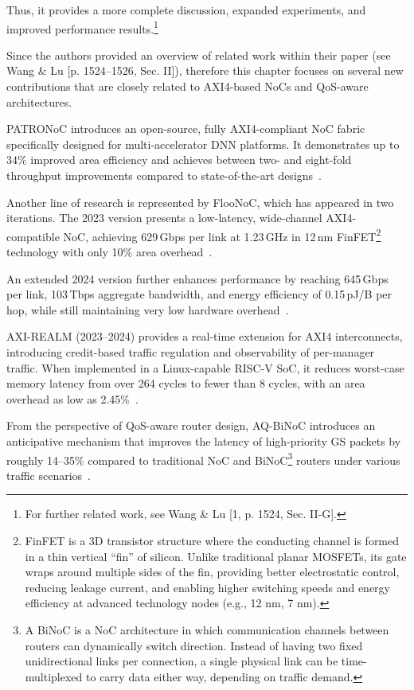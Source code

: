 Thus, it provides a more complete discussion, expanded experiments, and improved performance results.\footnote{For further related work, see Wang \& Lu [1, p. 1524, Sec. II-G].} 
\fi


Since the authors provided an overview of related work within their paper (see Wang \& Lu [p. 1524--1526, Sec. II]), therefore this chapter focuses on several new contributions that are closely related to AXI4-based NoCs and QoS-aware architectures.

PATRONoC introduces an open-source, fully AXI4-compliant NoC fabric specifically designed for multi-accelerator \ac{DNN} platforms. It demonstrates up to 34\% improved area efficiency and achieves between two- and eight-fold throughput improvements compared to state-of-the-art designs~\cite{jain_patronoc_2023}.

Another line of research is represented by FlooNoC, which has appeared in two iterations. The 2023 version presents a low-latency, wide-channel AXI4-compatible NoC, achieving 629\,Gbps per link at 1.23\,GHz in 12\,nm \ac{FinFET}\footnote{FinFET is a 3D transistor structure where the conducting channel is formed in a thin vertical “fin” of silicon. Unlike traditional planar MOSFETs, its gate wraps around multiple sides of the fin, providing better electrostatic control, reducing leakage current, and enabling higher switching speeds and energy efficiency at advanced technology nodes (e.g., 12 nm, 7 nm).} technology with only 10\% area overhead~\cite{fischer_floonoc_2023}.

An extended 2024 version further enhances performance by reaching 645\,Gbps per link, 103\,Tbps aggregate bandwidth, and energy efficiency of 0.15\,pJ/B per hop, while still maintaining very low hardware overhead~\cite{fischer_floonoc_2025}.

AXI-REALM (2023--2024) provides a real-time extension for AXI4 interconnects, introducing credit-based traffic regulation and observability of per-manager traffic. When implemented in a Linux-capable RISC-V SoC, it reduces worst-case memory latency from over 264 cycles to fewer than 8 cycles, with an area overhead as low as 2.45\%~\cite{benz_axi-realm_2023, benz_axi-realm_2025}.

From the perspective of QoS-aware router design, AQ-BiNoC introduces an anticipative mechanism that improves the latency of high-priority \ac{GS} packets by roughly 14--35\% compared to traditional NoC and \ac{BiNoC}\footnote{A BiNoC is a NoC architecture in which communication channels between routers can dynamically switch direction. Instead of having two fixed unidirectional links per connection, a single physical link can be time-multiplexed to carry data either way, depending on traffic demand.} routers under various traffic scenarios~\cite{tsai_anticipative_2022}.

